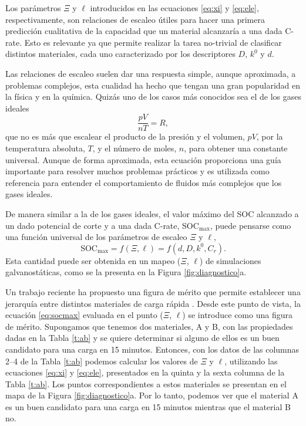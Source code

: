 Los parámetros $\Xi$ y $\ell$ introducidos en las ecuaciones \ref{eq:xi} y 
\ref{eq:ele}, respectivamente, son relaciones de escaleo útiles para hacer una
primera predicción cualitativa de la capacidad que un material alcanzaría a una
dada C-rate. Esto es relevante ya que permite realizar la tarea no-trivial de
clasificar distintos materiales, cada uno caracterizado por los descriptores $D$,
$k^0$ y $d$.

Las relaciones de escaleo suelen dar una respuesta simple, aunque aproximada, a 
problemas complejos, esta cualidad ha hecho que tengan una gran popularidad 
en la física y en la química. Quizás uno de los casos más conocidos sea el de los
gases ideales
\begin{equation}
    \frac{p V}{n T} = R,
\end{equation}
que no es más que escalear el producto de la presión y el volumen, $p V$, por la
temperatura absoluta, $T$, y el número de moles, $n$, para obtener una constante
universal. Aunque de forma aproximada, esta ecuación proporciona una guía 
importante para resolver muchos problemas prácticos y es utilizada como referencia
para entender el comportamiento de fluidos más complejos que los gases ideales.

De manera similar a la de los gases ideales, el valor máximo del SOC alcanzado a 
un dado potencial de corte y a una dada C-rate, SOC$_{\max}$, puede 
pensarse como una función universal de los parámetros de escaleo $\Xi$ y $\ell$,
\begin{equation}\label{eq:socmax}
    \text{SOC}_{\max} = f(\Xi, \ell) = f(d, D, k^0, C_r).
\end{equation}
Esta cantidad puede ser obtenida en un mapeo ($\Xi$, $\ell$) de simulaciones 
galvanostáticas, como se la presenta en la Figura \ref{fig:diagnostico}a.

Un trabajo reciente ha propuesto una figura de mérito que permite establecer 
una jerarquía entre distintos materiales de carga rápida \cite{xia2022}. Desde
este punto de vista, la ecuación \ref{eq:socmax} evaluada en el punto ($\Xi$, 
$\ell$) se introduce como una figura de mérito. Supongamos que tenemos dos 
materiales, A y B, con las propiedades dadas en la Tabla \ref{t:ab} y se quiere
determinar si alguno de ellos es un buen candidato para una carga en 15 minutos.
Entonces, con los datos de las columnas 2--4 de la Tabla \ref{t:ab} podemos 
calcular los valores de $\Xi$ y $\ell$, utilizando las ecuaciones \ref{eq:xi} y
\ref{eq:ele}, presentados en la quinta y la sexta columna de la Tabla \ref{t:ab}.
Los puntos correspondientes a estos materiales se presentan en el mapa de la 
Figura \ref{fig:diagnostico}a. Por lo tanto, podemos ver que el material A es 
un buen candidato para una carga en 15 minutos mientras que el material B no.

